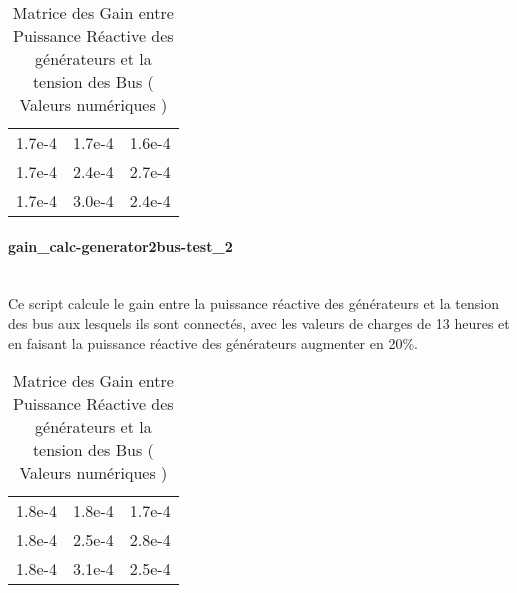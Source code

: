 \begin{table}[H]
	\captionsetup{justification=centering,margin=2cm}
	\caption{Matrice des Gain entre Puissance Réactive des générateurs et la tension des Bus ( Valeurs numériques )}
	\centering
	\begin{tabular}{ccc}
		1.7e-4&1.7e-4&1.6e-4\\
		1.7e-4&2.4e-4&2.7e-4\\
		1.7e-4&3.0e-4&2.4e-4\\
	\end{tabular}
	
\end{table}
\paragraph{gain\_calc-generator2bus-test\_2\\\\}
Ce script calcule le gain entre la puissance réactive des générateurs et la tension des bus aux lesquels ils sont connectés, avec les valeurs de charges de 13 heures et en faisant la puissance réactive des générateurs augmenter en 20\%.

\begin{table}[H]
	\captionsetup{justification=centering,margin=2cm}
	\caption{Matrice des Gain entre Puissance Réactive des générateurs et la tension des Bus ( Valeurs numériques )}
	\centering
	\begin{tabular}{ccc}
		
		1.8e-4&1.8e-4&1.7e-4\\
		
		1.8e-4&2.5e-4&2.8e-4\\
		
		1.8e-4&3.1e-4&2.5e-4\\
	\end{tabular}
\end{table}

